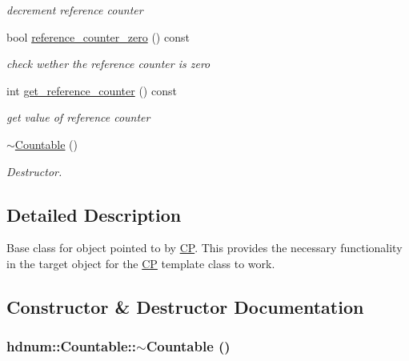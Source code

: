 \begin{DoxyCompactItemize}
\begin{DoxyCompactList}\small\item\em decrement reference counter \item\end{DoxyCompactList}\item 
\hypertarget{classhdnum_1_1Countable_a13818b6671192ee672b96abaf2467eb2}{
bool \hyperlink{classhdnum_1_1Countable_a13818b6671192ee672b96abaf2467eb2}{reference\_\-counter\_\-zero} () const }
\label{classhdnum_1_1Countable_a13818b6671192ee672b96abaf2467eb2}

\begin{DoxyCompactList}\small\item\em check wether the reference counter is zero \item\end{DoxyCompactList}\item 
\hypertarget{classhdnum_1_1Countable_aae830a9bca6bf2223b1383e2c4dd7d22}{
int \hyperlink{classhdnum_1_1Countable_aae830a9bca6bf2223b1383e2c4dd7d22}{get\_\-reference\_\-counter} () const }
\label{classhdnum_1_1Countable_aae830a9bca6bf2223b1383e2c4dd7d22}

\begin{DoxyCompactList}\small\item\em get value of reference counter \item\end{DoxyCompactList}\item 
\hyperlink{classhdnum_1_1Countable_a3a8b009981f6c23579c45770ab18f1aa}{$\sim$Countable} ()
\begin{DoxyCompactList}\small\item\em Destructor. \item\end{DoxyCompactList}\end{DoxyCompactItemize}


\subsection{Detailed Description}
Base class for object pointed to by \hyperlink{classhdnum_1_1CP}{CP}. This provides the necessary functionality in the target object for the \hyperlink{classhdnum_1_1CP}{CP} template class to work. 

\subsection{Constructor \& Destructor Documentation}
\hypertarget{classhdnum_1_1Countable_a3a8b009981f6c23579c45770ab18f1aa}{
\subsubsection[{$\sim$Countable}]{\setlength{\rightskip}{0pt plus 5cm}hdnum::Countable::$\sim$Countable ()}}
\label{classhdnum_1_1Countable_a3a8b009981f6c23579c45770ab18f1aa}


